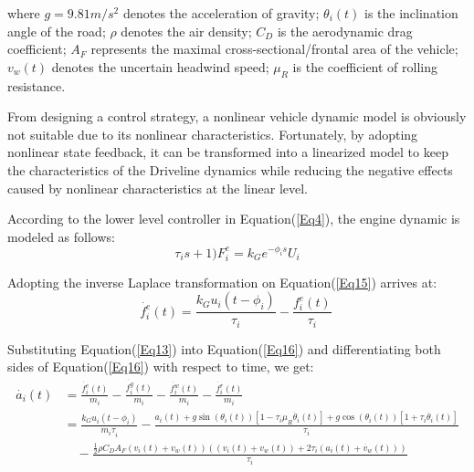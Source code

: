 \documentclass[a4paper]{cas-sc}
\begin{document}
where $g=9.81m/s^2$ denotes the acceleration of gravity; $\theta_i(t)$ is the inclination angle of the road; $\rho$ denotes the air density; $C_D$ is the aerodynamic drag coefficient; $A_F$ represents the maximal cross-sectional/frontal area of the vehicle; $v_w(t)$ denotes the uncertain headwind speed; $\mu_R$ is the coefficient of rolling resistance.

From designing a control strategy, a nonlinear vehicle dynamic model is obviously not suitable due to its nonlinear characteristics. Fortunately, by adopting nonlinear state feedback, it can be transformed into a linearized model to keep the characteristics of the Driveline dynamics while reducing the negative effects caused by nonlinear characteristics at the linear level.

According to the lower level controller in Equation(\ref{Eq4}), the engine dynamic is modeled as follows:
\begin{equation}
  \tau_is+1)F_i^e=k_Ge^{-\phi_is}U_i
  \label{Eq15}
\end{equation}


Adopting the inverse Laplace transformation on Equation(\ref{Eq15}) arrives at:
\begin{equation}
  \dot{f_i^e}\left(t\right)=\frac{k_Gu_i(t-\phi_i)}{\tau_i}-\frac{f_i^e\left(t\right)}{\tau_i}\
  \label{Eq16}
\end{equation}

Substituting Equation(\ref{Eq13}) into Equation(\ref{Eq16}) and differentiating both sides of Equation(\ref{Eq16}) with respect to time, we get:
\begin{equation}
  \begin{aligned}
    \dot{a_i}\left(t\right) & =\frac{\dot{f_i^e}\left(t\right)}{m_i}-\frac{\dot{f_i^g}\left(t\right)}{m_i}-\frac{\dot{f_i^w}\left(t\right)}{m_i}-\frac{\dot{f_i^r}\left(t\right)}{m_i}                                                                                                            \\
                            & =\frac{k_Gu_i(t-\phi_i)}{{m_i\tau}_i}-\frac{a_i\left(t\right)+g\sin{\left(\theta_i\left(t\right)\right)}\left[1-\tau_i\mu_R\dot{\theta_i}\left(t\right)\right]+g\cos{\left(\theta_i\left(t\right)\right)}\left[1+\tau_i\dot{\theta_i}\left(t\right)\right]}{\tau_i} \\
                            & \quad -\frac{\frac{1}{2}\rho C_DA_F\left(v_i\left(t\right)+v_w\left(t\right)\right)\left(\left(v_i\left(t\right)+v_w\left(t\right)\right)+2\tau_i(a_i\left(t\right)+\dot{v_w}\left(t\right))\right)}{\tau_i}
  \end{aligned}
  \label{Eq17}
\end{equation}
\end{document}

